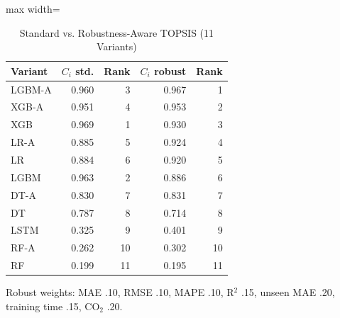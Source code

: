\begin{table}[!htb]
\centering
\caption{Standard vs. Robustness-Aware TOPSIS (11 Variants)}
\label{tab:robust}
\footnotesize
\setlength{\tabcolsep}{4pt}
\begin{adjustbox}{max width=\columnwidth}
\begin{tabular}{lrrrr}
\toprule
Variant & $C_i$ std. & Rank & $C_i$ robust & Rank \\
\midrule
LGBM-A & 0.960 & 3 & 0.967 & 1 \\
XGB-A & 0.951 & 4 & 0.953 & 2 \\
XGB & 0.969 & 1 & 0.930 & 3 \\
LR-A & 0.885 & 5 & 0.924 & 4 \\
LR & 0.884 & 6 & 0.920 & 5 \\
LGBM & 0.963 & 2 & 0.886 & 6 \\
DT-A & 0.830 & 7 & 0.831 & 7 \\
DT & 0.787 & 8 & 0.714 & 8 \\
LSTM & 0.325 & 9 & 0.401 & 9 \\
RF-A & 0.262 & 10 & 0.302 & 10 \\
RF & 0.199 & 11 & 0.195 & 11 \\
\bottomrule
\end{tabular}
\end{adjustbox}
\par\vspace{3pt}
{\scriptsize Robust weights: MAE .10, RMSE .10, MAPE .10, R$^2$ .15, unseen MAE .20, training time .15, CO$_2$ .20.\par}
\end{table}
